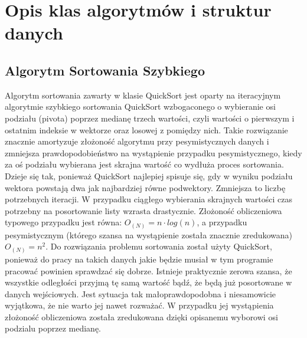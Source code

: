 \documentclass{article}
\newcommand\tab[1][1cm]{\hspace*{#1}}
\begin{document}
\section{Opis klas algorytmów i struktur danych}
\subsection{Algorytm Sortowania Szybkiego}
\tab Algorytm sortowania zawarty w klasie QuickSort jest oparty na iteracyjnym algorytmie szybkiego sortowania QuickSort wzbogaconego o wybieranie osi podziału (pivota) poprzez medianę trzech wartości, czyli wartości o pierwszym i ostatnim indeksie w wektorze oraz losowej z pomiędzy nich. Takie rozwiązanie znacznie amortyzuje złożoność algorytmu przy pesymistycznych danych i zmniejsza prawdopodobieństwo na wystąpienie przypadku pesymistycznego, kiedy za oś podziału wybierana jest skrajna wartość co wydłuża proces sortowania. Dzieje się tak, ponieważ QuickSort najlepiej spisuje się, gdy w wyniku podziału wektora powstają dwa jak najbardziej równe podwektory. Zmniejsza to liczbę potrzebnych iteracji. W przypadku ciągłego wybierania skrajnych wartości czas potrzebny na posortowanie listy wzrasta drastycznie. 
\newline \tab Złożoność obliczeniowa typowego przypadku jest równa: $O_{(N)} = n \cdot log(n)$, a przypadku pesymistycznym (którego szansa na wystąpienie została znacznie zredukowana) $O_{(N)} = n^2$. 
\newline \tab Do rozwiązania problemu sortowania został użyty QuickSort, ponieważ do pracy na takich danych jakie będzie musiał w tym programie pracować powinien sprawdzać się dobrze. Istnieje praktycznie zerowa szansa, że wszystkie odległości przyjmą tę samą wartość bądź, że będą już posortowane w danych wejściowych. Jest sytuacja tak małoprawdopodobna i niesamowicie wyjątkowa, że nie warto jej nawet rozważać. W przypadku jej wystąpienia złożoność obliczeniowa została zredukowana dzięki opisanemu wyborowi osi podzialu poprzez medianę.
\end{document}
